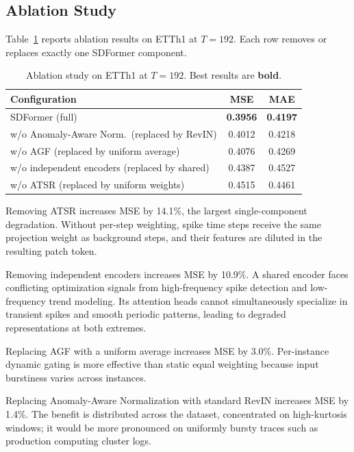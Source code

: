\documentclass[journal]{IEEEtran}
\begin{document}
\subsection{Ablation Study}

Table~\ref{tab:ablation} reports ablation results on ETTh1 at $T=192$.
Each row removes or replaces exactly one SDFormer component.

\begin{table}[!t]
\caption{Ablation study on ETTh1 at $T=192$. Best results are \textbf{bold}.}
\label{tab:ablation}
\centering
\renewcommand{\arraystretch}{1.15}
\begin{tabular}{lcc}
\toprule
\textbf{Configuration} & \textbf{MSE} & \textbf{MAE} \\
\midrule
SDFormer (full)                                     & \textbf{0.3956} & \textbf{0.4197} \\
w/o Anomaly-Aware Norm.\ (replaced by RevIN)        & 0.4012 & 0.4218 \\
w/o AGF (replaced by uniform average)               & 0.4076 & 0.4269 \\
w/o independent encoders (replaced by shared)       & 0.4387 & 0.4527 \\
w/o ATSR (replaced by uniform weights)              & 0.4515 & 0.4461 \\
\bottomrule
\end{tabular}
\end{table}

Removing ATSR increases MSE by 14.1\%, the largest single-component
degradation.
Without per-step weighting, spike time steps receive the same projection
weight as background steps, and their features are diluted in the resulting
patch token.

Removing independent encoders increases MSE by 10.9\%.
A shared encoder faces conflicting optimization signals from high-frequency
spike detection and low-frequency trend modeling.
Its attention heads cannot simultaneously specialize in transient spikes and
smooth periodic patterns, leading to degraded representations at both
extremes.

Replacing AGF with a uniform average increases MSE by 3.0\%.
Per-instance dynamic gating is more effective than static equal weighting
because input burstiness varies across instances.

Replacing Anomaly-Aware Normalization with standard RevIN increases MSE by
1.4\%.
The benefit is distributed across the dataset, concentrated on high-kurtosis
windows; it would be more pronounced on uniformly bursty traces such as
production computing cluster logs.
\end{document}
